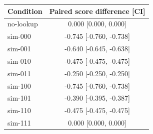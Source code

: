 \begin{tabular}{lc}\toprule
Condition & Paired score difference [CI]\\\midrule
no-lookup & 0.000 [0.000, 0.000]\\
sim-000 & -0.745 [-0.760, -0.738]\\
sim-001 & -0.640 [-0.645, -0.638]\\
sim-010 & -0.475 [-0.475, -0.475]\\
sim-011 & -0.250 [-0.250, -0.250]\\
sim-100 & -0.745 [-0.760, -0.738]\\
sim-101 & -0.390 [-0.395, -0.387]\\
sim-110 & -0.475 [-0.475, -0.475]\\
sim-111 & 0.000 [0.000, 0.000]\\\bottomrule\end{tabular}
